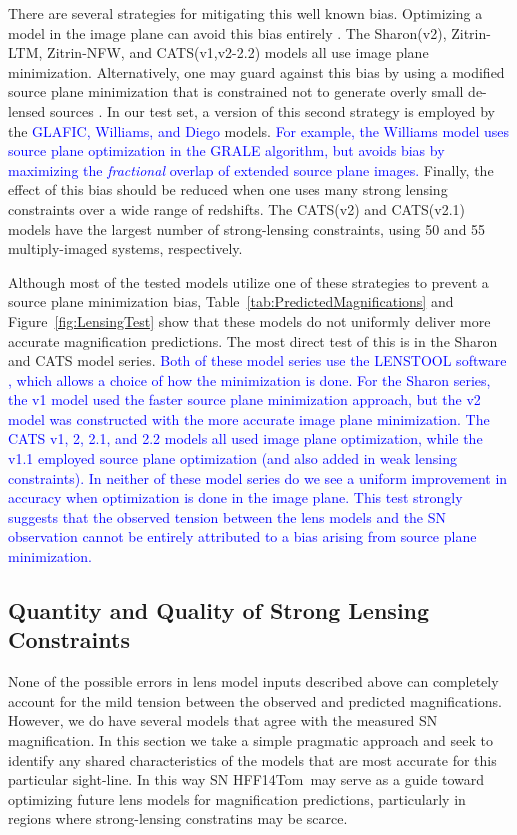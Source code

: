 \documentclass[iop]{emulateapj}
\newcommand{\change}[1]{{ \textcolor{blue}{#1}}}
\newcommand{\change}[1]{#1}
\def\tomas{HFF14Tom}
\begin{document}
There are several strategies for mitigating this well known bias.
Optimizing a model in the image plane can avoid this bias
entirely \citep{Broadhurst:2005,Zitrin:2009a}. The Sharon(v2),
Zitrin-LTM, Zitrin-NFW, and CATS(v1,v2-2.2) models all use image plane
minimization.  Alternatively, one may guard against this bias by using
a modified source plane minimization that is constrained not to
generate overly small de-lensed
sources \citep{Sendra:2014,Diego:2014}. In our test set, a version of
this second strategy is employed by the \change{GLAFIC, Williams, and
Diego} models.  \change{For example, the Williams model uses source
plane optimization in the GRALE algorithm, but avoids bias by
maximizing the {\it fractional} overlap of extended source plane
images.}  Finally, the effect of this bias should be reduced when one
uses many strong lensing constraints over a wide range of
redshifts. The CATS(v2) and CATS(v2.1) models have the largest number
of strong-lensing constraints, using 50 and 55 multiply-imaged
systems, respectively.

Although most of the tested models utilize one of these 
strategies to prevent a source plane minimization bias,
Table~\ref{tab:PredictedMagnifications} and
Figure~\ref{fig:LensingTest} show that these models do not uniformly
deliver more accurate magnification predictions.  The most direct test
of this is in the Sharon and CATS model series.  
\change{Both of these model series use the LENSTOOL 
software \citep{Kneib:1996,Jullo:2007,Jullo:2009,Kneib:2011a}, which
allows a choice of how the minimization is done.  For the Sharon
series, the v1 model used the faster source plane minimization
approach, but the v2 model was constructed with the more accurate
image plane minimization.  The CATS v1, 2, 2.1, and 2.2 models all
used image plane optimization, while the v1.1 employed source plane
optimization (and also added in weak lensing constraints).  In neither
of these model series do we see a uniform improvement in accuracy when
optimization is done in the image plane.  This test strongly suggests
that the observed tension between the lens models and the SN
observation cannot be entirely attributed to a bias arising from
source plane minimization.}

\subsection{Quantity and Quality of Strong Lensing Constraints}
\label{sec:QuantityAndQuality}

None of the possible errors in lens model inputs described above can
completely account for the mild tension between the observed and
predicted magnifications.  However, we do have several models that
agree with the measured SN magnification.  In this section we take a
simple pragmatic approach and seek to identify any shared
characteristics of the models that are most accurate for this
particular sight-line.  In this way SN \tomas\ may serve as a guide
toward optimizing future lens models for magnification predictions,
particularly in regions where strong-lensing constratins may be
scarce.
\end{document}
